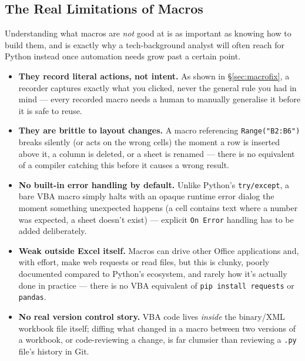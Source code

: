 \documentclass[11pt,a4paper]{article}
\begin{document}
\subsection{The Real Limitations of Macros}
\label{sec:macrolimits}

Understanding what macros are \emph{not} good at is as important as knowing how to build them, and is exactly why a tech-background analyst will often reach for Python instead once automation needs grow past a certain point.

\begin{pitfall}
\begin{itemize}
  \item \textbf{They record literal actions, not intent.} As shown in \S\ref{sec:macrofix}, a recorder captures exactly what you clicked, never the general rule you had in mind --- every recorded macro needs a human to manually generalise it before it is safe to reuse.
  \item \textbf{They are brittle to layout changes.} A macro referencing \texttt{Range("B2:B6")} breaks silently (or acts on the wrong cells) the moment a row is inserted above it, a column is deleted, or a sheet is renamed --- there is no equivalent of a compiler catching this before it causes a wrong result.
  \item \textbf{No built-in error handling by default.} Unlike Python's \texttt{try/except}, a bare VBA macro simply halts with an opaque runtime error dialog the moment something unexpected happens (a cell contains text where a number was expected, a sheet doesn't exist) --- explicit \texttt{On Error} handling has to be added deliberately.
  \item \textbf{Weak outside Excel itself.} Macros can drive other Office applications and, with effort, make web requests or read files, but this is clunky, poorly documented compared to Python's ecosystem, and rarely how it's actually done in practice --- there is no VBA equivalent of \texttt{pip install requests} or \texttt{pandas}.
  \item \textbf{No real version control story.} VBA code lives \emph{inside} the binary/XML workbook file itself; diffing what changed in a macro between two versions of a workbook, or code-reviewing a change, is far clumsier than reviewing a \texttt{.py} file's history in Git.
\end{itemize}
\end{pitfall}
\end{document}
